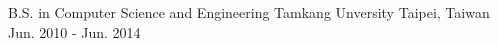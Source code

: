 

\begin{cventries}

  \cventry
    {B.S. in Computer Science and Engineering} %
    {Tamkang Unversity} %
    {Taipei, Taiwan} %
    {Jun. 2010 - Jun. 2014} %
    {
      \begin{cvitems} %
      \end{cvitems}
    }

\end{cventries}
